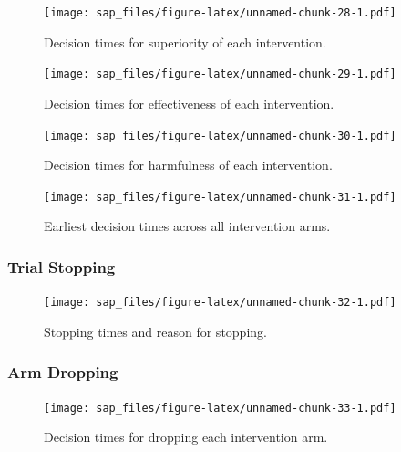 \documentclass[
  bibliography=totoc]{scrreprt}
\begin{document}
\begin{figure}
\centering
\texttt{[image: sap\_files/figure-latex/unnamed-chunk-28-1.pdf]}
\caption{\label{fig:unnamed-chunk-28}Decision times for superiority of each intervention.}
\end{figure}

\begin{figure}
\centering
\texttt{[image: sap\_files/figure-latex/unnamed-chunk-29-1.pdf]}
\caption{\label{fig:unnamed-chunk-29}Decision times for effectiveness of each intervention.}
\end{figure}

\begin{figure}
\centering
\texttt{[image: sap\_files/figure-latex/unnamed-chunk-30-1.pdf]}
\caption{\label{fig:unnamed-chunk-30}Decision times for harmfulness of each intervention.}
\end{figure}

\begin{figure}
\centering
\texttt{[image: sap\_files/figure-latex/unnamed-chunk-31-1.pdf]}
\caption{\label{fig:unnamed-chunk-31}Earliest decision times across all intervention arms.}
\end{figure}

\clearpage

\hypertarget{trial-stopping-2}{%
\subsubsection{Trial Stopping}\label{trial-stopping-2}}

\begin{figure}
\centering
\texttt{[image: sap\_files/figure-latex/unnamed-chunk-32-1.pdf]}
\caption{\label{fig:unnamed-chunk-32}Stopping times and reason for stopping.}
\end{figure}

\clearpage

\hypertarget{arm-dropping-2}{%
\subsubsection{Arm Dropping}\label{arm-dropping-2}}

\begin{figure}
\centering
\texttt{[image: sap\_files/figure-latex/unnamed-chunk-33-1.pdf]}
\caption{\label{fig:unnamed-chunk-33}Decision times for dropping each intervention arm.}
\end{figure}

\clearpage
\end{document}
